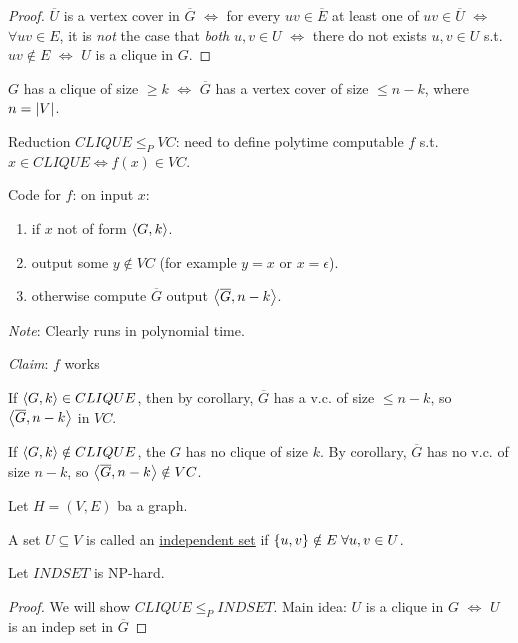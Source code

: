 \begin{proof}
    $\overline{U}$ is a vertex cover in $\overline{G}$ $\Leftrightarrow$ for every $uv \in \overline{E}$ at least one of $uv \in \overline{U}$ $\Leftrightarrow$ $\forall uv \in E$, it is \emph{not} the case that \emph{both} $u,v \in U$ $\Leftrightarrow$ there do not exists $u,v \in U$ s.t. $uv \notin E$ $\Leftrightarrow$ $U$ is a clique in $G$.
\end{proof}

\begin{corollary}
    $G$ has a clique of size $\geq k$ $\Leftrightarrow$ $\overline{G}$ has a vertex cover of size $\leq n-k$, where $n = \left | V \right |$.
\end{corollary}

Reduction $CLIQUE \leq_{P} VC$: need to define polytime computable $f$ s.t. $x \in CLIQUE \Leftrightarrow f(x) \in VC$.

Code for $f$: on input $x$:

\begin{enumerate}
    \item if $x$ not of form $\left \langle G, k \right \rangle$.
    \item output some $y \notin VC$ (for example $y = x$ or $x = \epsilon$).
    \item otherwise compute $\overline{G}$ output $\left \langle \overline{G}, n-k \right \rangle$.
\end{enumerate}

\emph{Note}: Clearly runs in polynomial time.

\emph{Claim}: $f$ works

If $\left \langle G, k \right \rangle \in CLIQUE$, then by corollary, $\overline{G}$ has a v.c. of size $\leq n-k$, so $\left \langle \overline{G}, n-k \right \rangle$ in $VC$.

If $\left \langle G, k \right \rangle \notin CLIQUE$, the $G$ has no clique of size $k$. By corollary, $\overline{G}$ has no v.c. of size $n-k$, so $\left \langle \overline{G}, n-k \right \rangle \notin VC$.

Let $H = (V, E)$ ba a graph.

\begin{definition}
    A set $U \subseteq V$ is called an \underline{independent set} if $\left \{ u, v \right \} \notin E \; \forall u, v \in U$.
\end{definition}

\begin{theorem}
    Let $INDSET$ is NP-hard.
\end{theorem}

\begin{proof}
    We will show $CLIQUE \leq_{P} INDSET$. Main idea: $U$ is a clique in $G$ $\Leftrightarrow$ $U$ is an indep set in $\overline{G}$

\end{proof}


